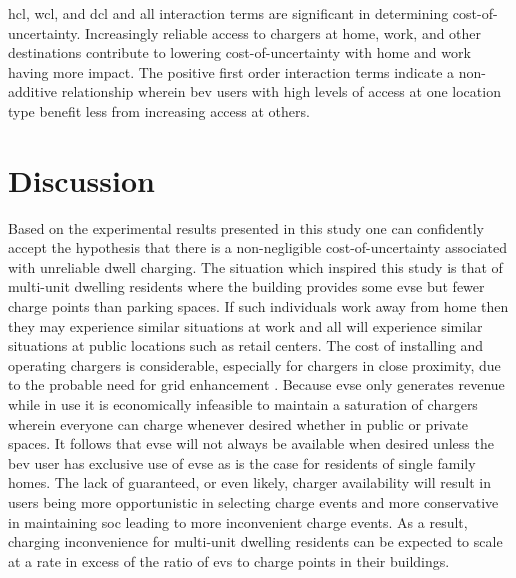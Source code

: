 \documentclass[letterpaper]{sae}
\begin{document}
\gls{hcl}, \gls{wcl}, and \gls{dcl} and all interaction terms are significant in determining cost-of-uncertainty. Increasingly reliable access to chargers at home, work, and other destinations contribute to lowering cost-of-uncertainty with home and work having more impact. The positive first order interaction terms indicate a non-additive relationship wherein \gls{bev} users with high levels of access at one location type benefit less from increasing access at others.

\section{Discussion}\label{sec:discussion}

Based on the experimental results presented in this study one can confidently accept the hypothesis that there is a non-negligible cost-of-uncertainty associated with unreliable dwell charging. The situation which inspired this study is that of multi-unit dwelling residents where the building provides some \gls{evse} but fewer charge points than parking spaces. If such individuals work away from home then they may experience similar situations at work and all will experience similar situations at public locations such as retail centers. The cost of installing and operating chargers is considerable, especially for chargers in close proximity, due to the probable need for grid enhancement \cite{Gamage_2023}. Because \gls{evse} only generates revenue while in use it is economically infeasible to maintain a saturation of chargers wherein everyone can charge whenever desired whether in public or private spaces. It follows that \gls{evse} will not always be available when desired unless the \gls{bev} user has exclusive use of \gls{evse} as is the case for residents of single family homes. The lack of guaranteed, or even likely, charger availability will result in users being more opportunistic in selecting charge events and more conservative in maintaining \gls{soc} leading to more inconvenient charge events. As a result, charging inconvenience for multi-unit dwelling residents can be expected to scale at a rate in excess of the ratio of \glspl{ev} to charge points in their buildings.
\end{document}
